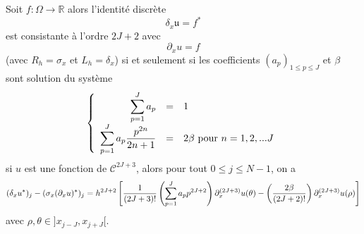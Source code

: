 \begin{theoreme}
Soit $f : \Omega \rightarrow \mathbb{R}$ alors l'identité discrète
\begin{equation}
\delta_{x} \mathfrak{u} = f^*
\end{equation}
est consistante à l'ordre $2J+2$ avec 
\begin{equation}
\partial_x u = f
\end{equation}
(avec $R_h = \sigma_x$ et $L_h = \delta_{x}$) si et seulement si les coefficients $(a_p)_{1 \leq p \leq J}$ et $\beta$ sont solution du système
\begin{equation}
\left\lbrace
\begin{array}{rcl}
\displaystyle\sum\limits_{p=1}^J a_p & = & 1 \\
\displaystyle\sum\limits_{p=1}^J a_p \dfrac{p^{2n}}{2n+1} & = & 2 \beta  \text{ pour } n=1,2,...J
\end{array}
\right.
\label{eq:hermitian_system}
\end{equation}
si $u$ est une fonction de $\mathcal{C}^{2J+3}$, alors pour tout $0 \leq j \leq N-1$, on a 
\begin{equation}
(\delta_{x} u^*)_j - (\sigma_{x} (\partial_x u)^*)_j = h^{2J+2} \left[ \dfrac{1}{(2J+3)!}  \left( \displaystyle\sum\limits_{p=1}^J a_p  p^{2J+2} \right)\partial_x^{(2J+3)}u(\theta)  - \left( \dfrac{2\beta}{(2J+2)!}   \right) \partial_x^{(2J+3)}u(\rho) \right]
\label{eq:eq_cons}
\end{equation} 
avec $\rho, \theta \in ]x_{j-J}, x_{j+J}[$.
\label{th:consistance_delta_x_implicite}
\end{theoreme}


